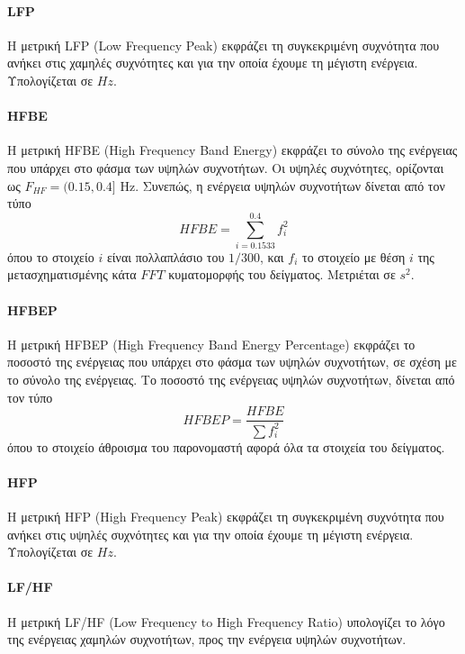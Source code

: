 \paragraph{LFP}
Η μετρική LFP (Low Frequency Peak) εκφράζει τη συγκεκριμένη συχνότητα που ανήκει στις χαμηλές συχνότητες και για την οποία έχουμε τη μέγιστη ενέργεια. Υπολογίζεται σε $Hz$.


\paragraph{HFBE}
Η μετρική HFBE (High Frequency Band Energy) εκφράζει το σύνολο της ενέργειας που υπάρχει στο φάσμα των υψηλών συχνοτήτων. Οι υψηλές συχνότητες, ορίζονται ως $F_{HF} = (0.15, 0.4]$ Hz. Συνεπώς, η ενέργεια υψηλών συχνοτήτων δίνεται από τον τύπο
\begin{equation}
\label{eq:hfbe}
   HFBE = \sum_{i=0.1533}^{0.4}f_i^2
\end{equation}
όπου το στοιχείο $i$ είναι πολλαπλάσιο του $1/300$, και $f_i$ το στοιχείο με θέση $i$ της μετασχηματισμένης κάτα $FFT$ κυματομορφής του δείγματος. Μετριέται σε $s^2$.

\paragraph{HFBEP}
Η μετρική HFBEP (High Frequency Band Energy Percentage) εκφράζει το ποσοστό της ενέργειας που υπάρχει στο φάσμα των υψηλών συχνοτήτων, σε σχέση με το σύνολο της ενέργειας. Το ποσοστό της ενέργειας υψηλών συχνοτήτων, δίνεται από τον τύπο
\begin{equation}
\label{eq:hfbep}
   HFBEP = \frac{HFBE}{\sum{f_i^2}}
\end{equation}
όπου το στοιχείο άθροισμα του παρονομαστή αφορά όλα τα στοιχεία του δείγματος.

\paragraph{HFP}
Η μετρική HFP (High Frequency Peak) εκφράζει τη συγκεκριμένη συχνότητα που ανήκει στις υψηλές συχνότητες και για την οποία έχουμε τη μέγιστη ενέργεια. Υπολογίζεται σε $Hz$.

\paragraph{LF/HF}
Η μετρική LF/HF (Low Frequency to High Frequency Ratio) υπολογίζει το λόγο της ενέργειας χαμηλών συχνοτήτων, προς την ενέργεια υψηλών συχνοτήτων.